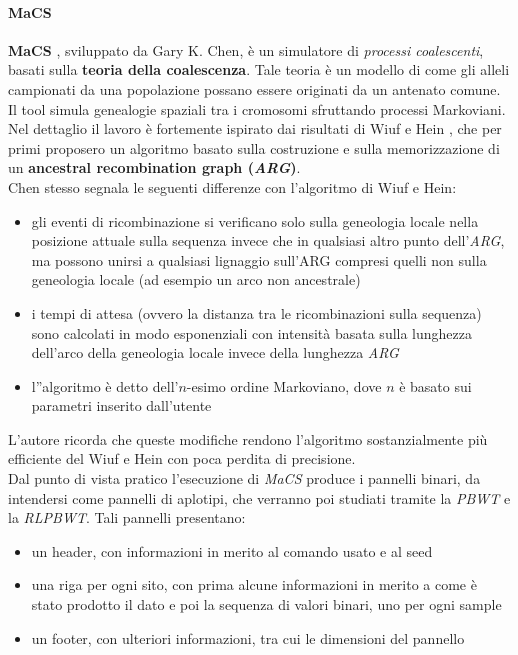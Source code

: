 \paragraph{MaCS}
\textbf{MaCS} \cite{macs}, sviluppato da Gary K. Chen, è un simulatore di
\textit{processi coalescenti}, basati sulla \textbf{teoria della
  coalescenza}. Tale teoria è un modello di come gli alleli campionati da una
popolazione possano essere originati da un antenato comune. Il tool simula
genealogie spaziali tra i cromosomi sfruttando processi Markoviani.\\
Nel dettaglio il lavoro è fortemente ispirato dai risultati di Wiuf e Hein
\cite{wiuf}, che per primi proposero un algoritmo basato sulla costruzione e
sulla memorizzazione di un \textbf{ancestral recombination graph
  (\textit{ARG})}.\\
Chen stesso segnala le seguenti differenze con l'algoritmo di Wiuf e Hein:
\begin{itemize}
  \item gli eventi di ricombinazione si verificano solo sulla geneologia locale
  nella posizione attuale sulla sequenza invece che in qualsiasi altro punto
  dell'\textit{ARG}, ma possono unirsi a qualsiasi lignaggio sull'ARG compresi
  quelli non sulla geneologia locale (ad esempio un arco non ancestrale)
  \item i tempi di attesa (ovvero la distanza tra le ricombinazioni sulla
  sequenza) sono calcolati in modo esponenziali con intensità basata sulla
  lunghezza dell'arco della geneologia locale invece della lunghezza
  \textit{ARG}
  \item l''algoritmo è detto dell'$n$-esimo ordine Markoviano, dove $n$ è basato
  sui parametri inserito dall'utente
\end{itemize}
L'autore ricorda che queste modifiche rendono l'algoritmo sostanzialmente più
efficiente del Wiuf e Hein con poca perdita di precisione. \\
Dal punto di vista pratico l'esecuzione di \textit{MaCS} produce i pannelli
binari, da intendersi come pannelli di aplotipi, che verranno poi studiati
tramite la \textit{PBWT} e la \textit{RLPBWT}. Tali pannelli presentano:
\begin{itemize}
  \item un header, con informazioni in merito al comando usato e al seed
  \item una riga per ogni sito, con prima alcune informazioni in merito a come è
  stato prodotto il dato e poi la sequenza di valori binari, uno per ogni sample
  \item un footer, con ulteriori informazioni, tra cui le dimensioni del
  pannello 
\end{itemize}
